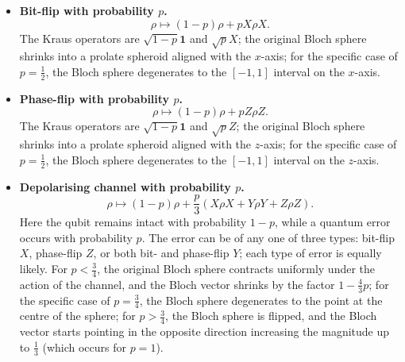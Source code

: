 \documentclass[fleqn]{article}
\begin{document}
\begin{itemize}
\item
  \textbf{Bit-flip with probability \(p\).}
  \[
      \rho \longmapsto (1-p)\rho+pX\rho X.
    \]
  The Kraus operators are \(\sqrt{1-p}\mathbf{1}\) and \(\sqrt{p}X\);
  the original Bloch sphere shrinks into a prolate spheroid aligned with the \(x\)-axis;
  for the specific case of \(p=\frac{1}{2}\), the Bloch sphere degenerates to the \([-1,1]\) interval on the \(x\)-axis.
\item
  \textbf{Phase-flip with probability \(p\).}
  \[
      \rho \longmapsto (1-p)\rho+pZ\rho Z.
    \]
  The Kraus operators are \(\sqrt{1-p}\mathbf{1}\) and \(\sqrt{p}Z\);
  the original Bloch sphere shrinks into a prolate spheroid aligned with the \(z\)-axis;
  for the specific case of \(p=\frac{1}{2}\), the Bloch sphere degenerates to the \([-1,1]\) interval on the \(z\)-axis.
\item
  \textbf{Depolarising channel with probability \(p\).}
  \[
      \rho\longmapsto (1-p)\rho + \frac{p}{3}\left(X\rho X+Y\rho Y+Z\rho Z\right).
    \]
  Here the qubit remains intact with probability \(1-p\), while a quantum error occurs with probability \(p\).
  The error can be of any one of three types: bit-flip \(X\), phase-flip \(Z\), or both bit- and phase-flip \(Y\); each type of error is equally likely.
  For \(p<\frac{3}{4}\), the original Bloch sphere contracts uniformly under the action of the channel, and the Bloch vector shrinks by the factor \(1-\frac{4}{3}p\);
  for the specific case of \(p=\frac{3}{4}\), the Bloch sphere degenerates to the point at the centre of the sphere;
  for \(p>\frac{3}{4}\), the Bloch sphere is flipped, and the Bloch vector starts pointing in the opposite direction increasing the magnitude up to \(\frac{1}{3}\) (which occurs for \(p=1\)).
\end{itemize}
\end{document}
